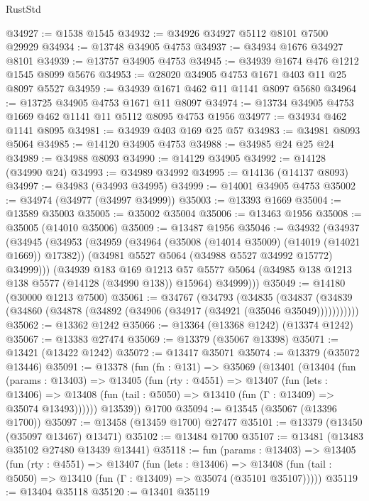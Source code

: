 \begin{lexlean}{RustStd}
\begin{coremodule}
@34927 := @1538 @1545
@34932 := @34926 @34927 @5112 @8101 @7500 @29929
@34934 := @13748 @34905 @4753
@34937 := @34934 @1676 @34927 @8101
@34939 := @13757 @34905 @4753
@34945 := @34939 @1674 @476 @1212 @1545 @8099 @5676
@34953 := @28020 @34905 @4753 @1671 @403 @11 @25 @8097 @5527
@34959 := @34939 @1671 @462 @11 @1141 @8097 @5680
@34964 := @13725 @34905 @4753 @1671 @11 @8097
@34974 := @13734 @34905 @4753 @1669 @462 @1141 @11 @5112 @8095 @4753 @1956
@34977 := @34934 @462 @1141 @8095
@34981 := @34939 @403 @169 @25 @57
@34983 := @34981 @8093 @5064
@34985 := @14120 @34905 @4753
@34988 := @34985 @24 @25 @24
@34989 := @34988 @8093
@34990 := @14129 @34905
@34992 := @14128 (@34990 @24)
@34993 := @34989 @34992
@34995 := @14136 (@14137 @8093)
@34997 := @34983 (@34993 @34995)
@34999 := @14001 @34905 @4753
@35002 := @34974 (@34977 (@34997 @34999))
@35003 := @13393 @1669
@35004 := @13589 @35003
@35005 := @35002 @35004
@35006 := @13463 @1956
@35008 := @35005 (@14010 @35006)
@35009 := @13487 @1956
@35046 := @34932
    (@34937
      (@34945
        (@34953
          (@34959
            (@34964 (@35008 (@14014 @35009) (@14019 (@14021 @1669)) @17382))
            (@34981 @5527 @5064 (@34988 @5527 @34992 @15772) @34999)))
        (@34939
          @183
          @169
          @1213
          @57
          @5577
          @5064
          (@34985 @138 @1213 @138 @5577 (@14128 (@34990 @138)) @15964)
          @34999)))
@35049 := @14180 (@30000 @1213 @7500)
@35061 := @34767
    (@34793
      (@34835
        (@34837 (@34839 (@34860 (@34878 (@34892 (@34906 (@34917 (@34921 (@35046 @35049)))))))))))
@35062 := @13362 @1242
@35066 := @13364 (@13368 @1242) (@13374 @1242)
@35067 := @13383 @27474
@35069 := @13379 (@35067 @13398)
@35071 := @13421 (@13422 @1242)
@35072 := @13417 @35071
@35074 := @13379 (@35072 @13446)
@35091 := @13378
    (fun (fn : @131) =>
    @35069
      (@13401
        (@13404
          (fun (params : @13403) =>
          @13405
            (fun (rty : @4551) =>
            @13407
              (fun (lets : @13406) =>
              @13408 (fun (tail : @5050) => @13410 (fun (Γ : @13409) => @35074 @13493))))))
        @13539))
    @1700
@35094 := @13545 (@35067 (@13396 @1700))
@35097 := @13458 (@13459 @1700) @27477
@35101 := @13379 (@13450 (@35097 @13467) @13471)
@35102 := @13484 @1700
@35107 := @13481 (@13483 @35102 @27480 @13439 @13441)
@35118 := fun (params : @13403) =>
  @13405
    (fun (rty : @4551) =>
    @13407
      (fun (lets : @13406) =>
      @13408 (fun (tail : @5050) => @13410 (fun (Γ : @13409) => @35074 (@35101 @35107)))))
@35119 := @13404 @35118
@35120 := @13401 @35119

\end{coremodule}
\end{lexlean}
